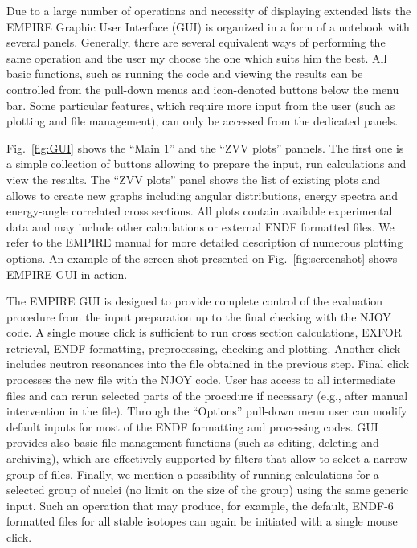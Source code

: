 Due to a large number of operations and necessity of displaying extended
lists the EMPIRE Graphic User Interface (GUI) is organized in a form of a
notebook with several panels. Generally, there are several equivalent ways
of performing the same operation and the user my choose the one which suits
him the best. All basic functions, such as running the code and viewing the
results can be controlled from the pull-down menus and icon-denoted buttons
below the menu bar. Some particular features, which require more input from
the user (such as plotting and file management), can only be accessed from
the dedicated panels.

Fig.~\ref{fig:GUI} shows the ``Main 1'' and the ``ZVV plots'' pannels. The
first one is a simple collection of buttons allowing to prepare the input,
run calculations and view the results. The ``ZVV plots'' panel shows the
list of existing plots and allows to create new graphs including angular
distributions, energy spectra and energy-angle correlated cross sections.
All plots contain available experimental data and may include other
calculations or external ENDF formatted files. We refer to the EMPIRE manual
for more detailed description of numerous plotting options. An example of
the screen-shot presented on Fig.~\ref{fig:screenshot} shows EMPIRE GUI in
action.

\begin{figure*}[htbp]
\caption{Screen-shot of the EMPIRE GUI with a generated plot of cross
sections for the inelastic scattering to the first 4 levels in $^{89}$Y.
Note the capability of the interface to multiply results by a power of 10 to
separate the curves.}
\label{fig:screenshot}
\end{figure*}

The EMPIRE GUI is designed to provide complete control of the evaluation
procedure from the input preparation up to the final checking with the NJOY
code. A single mouse click is sufficient to run cross section calculations,
EXFOR retrieval, ENDF formatting, preprocessing, checking and plotting.
Another click includes neutron resonances into the file obtained in the
previous step. Final click processes the new file with the NJOY code. User
has access to all intermediate files and can rerun selected parts of the
procedure if necessary (e.g., after manual intervention in the file).
Through the ``Options'' pull-down menu user can modify default inputs for
most of the ENDF formatting and processing codes. GUI provides also basic
file management functions (such as editing, deleting and archiving), which
are effectively supported by filters that allow to select a narrow group of
files. Finally, we mention a possibility of running calculations for a
selected group of nuclei (no limit on the size of the group) using the same
generic input. Such an operation that may produce, for example, the default,
ENDF-6 formatted files for all stable isotopes can again be initiated with a
single mouse click.

